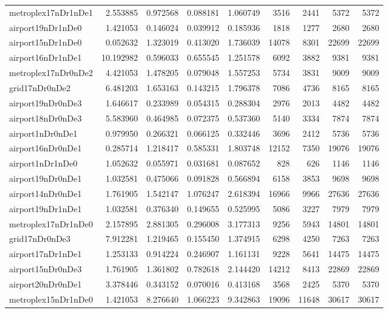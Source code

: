 \begin{longtable}{|l|r|r|r|r|r|r|r|r|}
metroplex17nDr1nDe1 & 2.553885 & 0.972568 & 0.088181 & 1.060749 & 3516 & 2441 & 5372 & 5372 \\
airport19nDr1nDe0 & 1.421053 & 0.146024 & 0.039912 & 0.185936 & 1818 & 1277 & 2680 & 2680 \\
airport15nDr1nDe0 & 0.052632 & 1.323019 & 0.413020 & 1.736039 & 14078 & 8301 & 22699 & 22699 \\
airport16nDr1nDe1 & 10.192982 & 0.596033 & 0.655545 & 1.251578 & 6092 & 3882 & 9381 & 9381 \\
metroplex17nDr0nDe2 & 4.421053 & 1.478205 & 0.079048 & 1.557253 & 5734 & 3831 & 9009 & 9009 \\
grid17nDr0nDe2 & 6.481203 & 1.653163 & 0.143215 & 1.796378 & 7086 & 4736 & 8165 & 8165 \\
airport19nDr0nDe3 & 1.646617 & 0.233989 & 0.054315 & 0.288304 & 2976 & 2013 & 4482 & 4482 \\
airport18nDr0nDe3 & 5.583960 & 0.464985 & 0.072375 & 0.537360 & 5140 & 3334 & 7874 & 7874 \\
airport1nDr0nDe1 & 0.979950 & 0.266321 & 0.066125 & 0.332446 & 3696 & 2412 & 5736 & 5736 \\
airport16nDr0nDe1 & 0.285714 & 1.218417 & 0.585331 & 1.803748 & 12152 & 7350 & 19076 & 19076 \\
airport1nDr1nDe0 & 1.052632 & 0.055971 & 0.031681 & 0.087652 & 828 & 626 & 1146 & 1146 \\
airport19nDr0nDe1 & 1.032581 & 0.475066 & 0.091828 & 0.566894 & 6158 & 3853 & 9698 & 9698 \\
airport14nDr0nDe1 & 1.761905 & 1.542147 & 1.076247 & 2.618394 & 16966 & 9966 & 27636 & 27636 \\
airport19nDr1nDe1 & 1.032581 & 0.376340 & 0.149655 & 0.525995 & 5086 & 3227 & 7979 & 7979 \\
metroplex17nDr1nDe0 & 2.157895 & 2.881305 & 0.296008 & 3.177313 & 9256 & 5943 & 14801 & 14801 \\
grid17nDr0nDe3 & 7.912281 & 1.219465 & 0.155450 & 1.374915 & 6298 & 4250 & 7263 & 7263 \\
airport17nDr1nDe1 & 1.253133 & 0.914224 & 0.246907 & 1.161131 & 9228 & 5641 & 14475 & 14475 \\
airport15nDr0nDe3 & 1.761905 & 1.361802 & 0.782618 & 2.144420 & 14212 & 8413 & 22869 & 22869 \\
airport20nDr0nDe1 & 3.378446 & 0.343152 & 0.070016 & 0.413168 & 3568 & 2425 & 5370 & 5370 \\
metroplex15nDr1nDe0 & 1.421053 & 8.276640 & 1.066223 & 9.342863 & 19096 & 11648 & 30617 & 30617 \\

\end{longtable}

